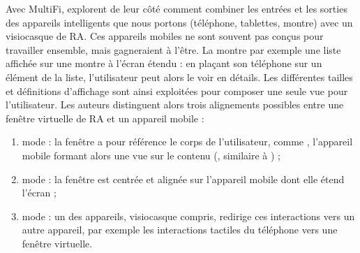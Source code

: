 
Avec MultiFi, \cite{Grubert2015} explorent de leur côté comment combiner les entrées et les sorties des appareils intelligents que nous portons (téléphone, tablettes, montre) avec un visiocasque de RA. Ces appareils mobiles ne sont souvent pas conçus pour travailler ensemble, mais gagneraient à l'être. La  montre par exemple une liste affichée sur une montre à l'écran étendu : en plaçant son téléphone sur un élément de la liste, l'utilisateur peut alors le voir en détails. Les différentes tailles et définitions d'affichage sont ainsi exploitées pour composer une seule vue pour l'utilisateur.  Les auteurs distinguent alors trois alignements possibles entre une fenêtre virtuelle de RA et un appareil mobile  :
\begin{enumerate}
  \item mode  : la fenêtre a pour référence le corps de l'utilisateur, comme \cite{Ens2014}, l'appareil mobile formant alors une vue  sur le contenu (, similaire à \cite{Berge2014}) ;
  \item mode  : la fenêtre est centrée et alignée sur l'appareil mobile dont elle étend l'écran  ;
  \item mode  : un des appareils, visiocasque compris, redirige ces interactions vers un autre appareil, par exemple les interactions tactiles du téléphone vers une fenêtre virtuelle.
\end{enumerate}
\medskip


